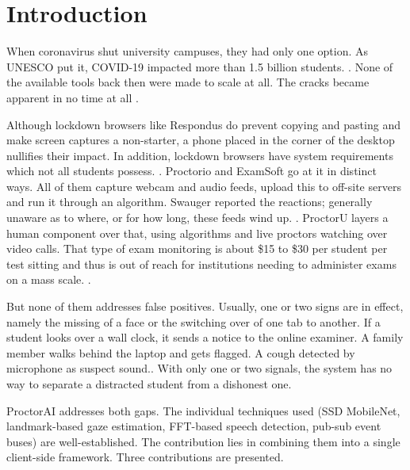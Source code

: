 \documentclass[runningheads]{llncs}
\begin{document}
\section{Introduction}

When coronavirus shut university campuses, they had only one option. As UNESCO put it, COVID-19 impacted more than 1.5 billion students. \cite{unesco2020}. None of the available tools back then were made to scale at all. The cracks became apparent in no time at all \cite{hussein2020}.

Although lockdown browsers like Respondus do prevent copying and pasting and make screen captures a non-starter, a phone placed in the corner of the desktop nullifies their impact. In addition, lockdown browsers have system requirements which not all students possess. \cite{coghlan2021}. Proctorio and ExamSoft go at it in distinct ways. All of them capture webcam and audio feeds, upload this to off-site servers and run it through an algorithm. Swauger reported the reactions; generally unaware as to where, or for how long, these feeds wind up. \cite{swauger2020}. ProctorU layers a human component over that, using algorithms and live proctors watching over video calls. That type of exam monitoring is about \$15 to \$30 per student per test sitting and thus is out of reach for institutions needing to administer exams on a mass scale. \cite{nigam2021}.

But none of them addresses false positives. Usually, one or two signs are in effect, namely the missing of a face or the switching over of one tab to another. If a student looks over a wall clock, it sends a notice to the online examiner. A family member walks behind the laptop and gets flagged. A cough detected by microphone as suspect sound.\cite{dewan2019}. With only one or two signals, the system has no way to separate a distracted student from a dishonest one.

ProctorAI addresses both gaps. The individual techniques used (SSD MobileNet, landmark-based gaze estimation, FFT-based speech detection, pub-sub event buses) are well-established. The contribution lies in combining them into a single client-side framework. Three contributions are presented.
\end{document}
